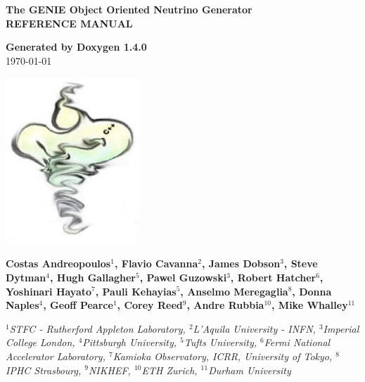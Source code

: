 \documentclass[a4paper]{book}
\begin{document}
\begin{titlepage}
\vspace*{3cm}
\begin{center}

{\Large \textbf{The GENIE Object Oriented Neutrino Generator}}\\
\vspace*{1cm}
{\Large \textbf{REFERENCE MANUAL}}\\
\vspace*{1cm}

{\large \textbf{Generated by Doxygen 1.4.0}}\\
\vspace*{0.5cm}
{\large \today}\\
\vspace*{1cm}

\includegraphics[width=5cm,keepaspectratio]{../../data/logo/genie_logo.eps}

\vspace*{0.6cm}

{\textbf{Costas Andreopoulos$^{1}$, Flavio Cavanna$^{2}$, James Dobson$^{3}$, Steve Dytman$^{4}$,
Hugh Gallagher$^{5}$, Pawel Guzowski$^{3}$, Robert Hatcher$^{6}$, Yoshinari Hayato$^{7}$, Pauli Kehayias$^{5}$, 
Anselmo Meregaglia$^{8}$, Donna Naples$^{4}$, Geoff Pearce$^{1}$, 
Corey Reed$^{9}$, Andre Rubbia$^{10}$, Mike Whalley$^{11}$}}\\
\vspace*{0.5cm}

{\textit{
$^{1}$STFC - Rutherford Appleton Laboratory,
$^{2}$L'Aquila University - INFN, 
$^{3}$Imperial College London, 
$^{4}$Pittsburgh University, 
$^{5}$Tufts University,
$^{6}$Fermi National Accelerator Laboratory, 
$^{7}$Kamioka Observatory, ICRR, University of Tokyo, 
$^{8}$IPHC Strasbourg, 
$^{9}$NIKHEF, 
$^{10}$ETH Zurich, 
$^{11}$Durham University}}

\end{center}
\end{titlepage}
\clearemptydoublepage
{}
\tableofcontents
\clearemptydoublepage
{}
\end{document}
